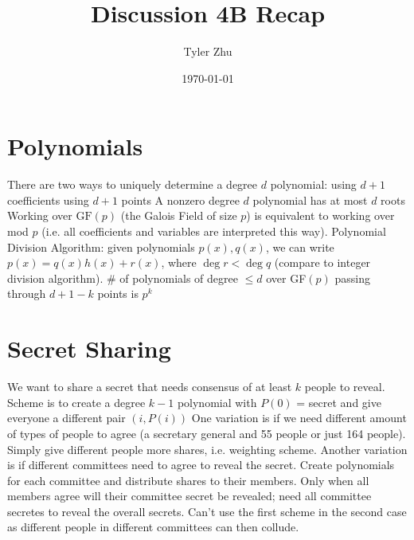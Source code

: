 \documentclass[11 pt]{scrartcl}
\newcommand{\hwtitle}{Discussion 4B Recap}
\begin{document}
 
\title{\Large \hwtitle{}}
\author{\large Tyler Zhu}
\date{\large\today}

\maketitle 

\section{Polynomials}
\itemnum
    \ii There are two ways to uniquely determine a degree $d$ polynomial: 
    \itemnum
        \ii using $d+1$ coefficients
        \ii using $d+1$ points
    \itemend
    \ii A nonzero degree $d$ polynomial has at most $d$ roots
    \ii Working over $\text{GF}(p)$ (the Galois Field of size $p$) is equivalent to working over mod $p$ (i.e. all coefficients and variables are interpreted this way). 
    \ii Polynomial Division Algorithm: given polynomials $p(x), q(x)$, we can write $p(x) = q(x)h(x) + r(x)$, where $\deg r < \deg q$ (compare to integer division algorithm).  
    \ii \# of polynomials of degree $\leq d$ over GF$(p)$ passing through $d+1-k$ points is $p^k$ 
\itemend

\section{Secret Sharing}
\itemnum
    \ii We want to share a secret that needs consensus of at least $k$ people to reveal. 
    \ii Scheme is to create a degree $k-1$ polynomial with $P(0)$ = secret and give everyone a different pair $(i, P(i))$
    \ii One variation is if we need different amount of types of people to agree (a secretary general and 55 people or just 164 people). Simply give different people more shares, i.e. weighting scheme. 
    \ii Another variation is if different committees need to agree to reveal the secret. Create polynomials for each committee and distribute shares to their members. Only when all members agree will their committee secret be revealed; need all committee secretes to reveal the overall secrets. 
    \ii Can't use the first scheme in the second case as different people in different committees can then collude. 
\itemend
\end{document}
